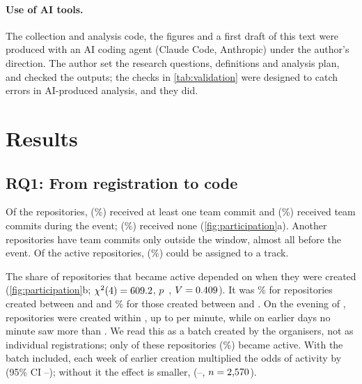 \documentclass{article}
\begin{document}
\paragraph{Use of AI tools.}
The collection and analysis code, the figures and a first draft of this text were produced with an AI coding agent (Claude Code, Anthropic) under the author's direction. The author set the research questions, definitions and analysis plan, and checked the outputs; the checks in \cref{tab:validation} were designed to catch errors in AI-produced analysis, and they did. 

\section{Results}\label{sec:results}

\subsection{RQ1: From registration to code}

Of the \NReposTotal{} repositories, \NReposWithCommits{} (\NPctWithCommits\%) received at least one team commit and \NReposActive{} (\NPctActive\%) received team commits during the event; \NReposEmpty{} (\NPctEmpty\%) received none (\cref{fig:participation}a). Another \NReposOutsideOnly{} repositories have team commits only outside the window, almost all before the event. Of the active repositories, \NReposMatchedTrack{} (\NPctMatchedOfActive\%) could be assigned to a track.

The share of repositories that became active depended on when they were created (\cref{fig:participation}b; $\chi^2(\num{4}) = \num{609.2}$, $p$~\NRegistrationChiTwoP, $V = \num{0.409}$). It was \NRegistrationSepZeroOneOneFourPct\% for repositories created between \sepone{} and \seponefour{} and \NRegistrationSepOneFiveTwoOnePct\% for those created between \sepfifteen{} and \septwentyone{}. On the evening of \batchday{}, \NBatchN{} repositories were created within \batchwindow{}, up to \NBatchMaxPerMinute{} per minute, while on earlier days no minute saw more than \NOrganicMaxPerMinute{}. We read this as a batch created by the organisers, not as individual registrations; only \NBatchActive{} of these repositories (\NBatchPctActive\%) became active. With the batch included, each week of earlier creation multiplied the odds of activity by \NRegistrationLogitOrPerWeek{} (95\% CI \NRegistrationLogitLo--\NRegistrationLogitHi); without it the effect is smaller, \NRegistrationLogitNoBatchOrPerWeek{} (\NRegistrationLogitNoBatchLo--\NRegistrationLogitNoBatchHi, $n = \num{2570}$).
\end{document}

